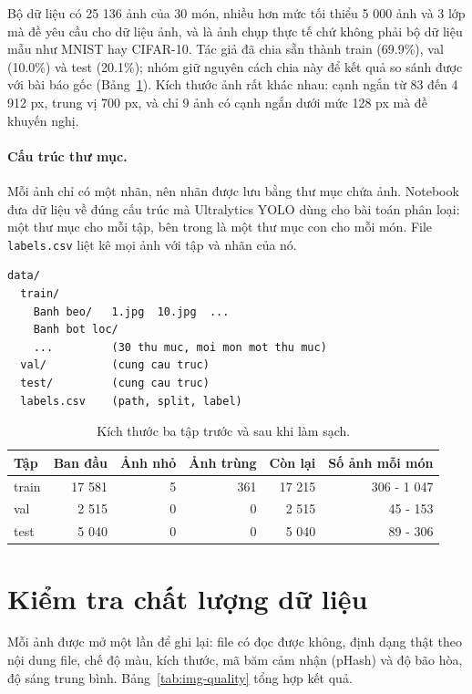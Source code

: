 Bộ dữ liệu có 25 136 ảnh của 30 món, nhiều hơn mức tối thiểu 5 000 ảnh và 3 lớp mà đề yêu cầu cho dữ liệu ảnh, và là
ảnh chụp thực tế chứ không phải bộ dữ liệu mẫu như MNIST hay CIFAR-10. Tác giả đã chia sẵn thành train (69.9\%), val
(10.0\%) và test (20.1\%); nhóm giữ nguyên cách chia này để kết quả so sánh được với bài báo gốc
(Bảng~\ref{tab:img-split}). Kích thước ảnh rất khác nhau: cạnh ngắn từ 83 đến 4 912 px, trung vị 700 px, và chỉ 9 ảnh
có cạnh ngắn dưới mức 128 px mà đề khuyến nghị.

\paragraph{Cấu trúc thư mục.} Mỗi ảnh chỉ có một nhãn, nên nhãn được lưu bằng thư mục chứa ảnh. Notebook đưa dữ liệu về
đúng cấu trúc mà Ultralytics YOLO dùng cho bài toán phân loại: một thư mục cho mỗi tập, bên trong là một thư mục con cho
mỗi món. File \texttt{labels.csv} liệt kê mọi ảnh với tập và nhãn của nó.

\begin{verbatim}
data/
  train/
    Banh beo/   1.jpg  10.jpg  ...
    Banh bot loc/
    ...         (30 thu muc, moi mon mot thu muc)
  val/          (cung cau truc)
  test/         (cung cau truc)
  labels.csv    (path, split, label)
\end{verbatim}

\begin{table}[H]\centering
\caption{Kích thước ba tập trước và sau khi làm sạch.}\label{tab:img-split}
\begin{tabular}{lrrrrr}
\toprule
Tập & Ban đầu & Ảnh nhỏ & Ảnh trùng & Còn lại & Số ảnh mỗi món \\
\midrule
train & 17 581 & 5 & 361 & 17 215 & 306 - 1 047 \\
val & 2 515 & 0 & 0 & 2 515 & 45 - 153 \\
test & 5 040 & 0 & 0 & 5 040 & 89 - 306 \\
\bottomrule
\end{tabular}
\end{table}

\section{Kiểm tra chất lượng dữ liệu}

Mỗi ảnh được mở một lần để ghi lại: file có đọc được không, định dạng thật theo nội dung file, chế độ màu, kích thước,
mã băm cảm nhận (pHash) và độ bão hòa, độ sáng trung bình. Bảng~\ref{tab:img-quality} tổng hợp kết quả.


